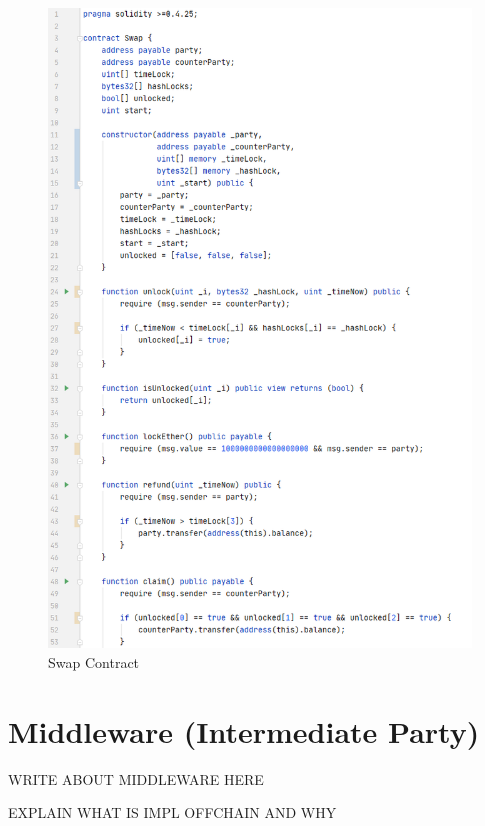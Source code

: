 \begin{figure}[h]
	\includegraphics[width=0.7\paperwidth]{swap_contract}	%
	\caption{Swap Contract}
	\label{fig:swap_contract}
\end{figure}
\clearpage

\section{Middleware (Intermediate Party)}
\label{sec:chapter04:middleware}
WRITE ABOUT MIDDLEWARE HERE

EXPLAIN WHAT IS IMPL OFFCHAIN AND WHY

